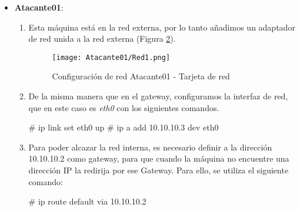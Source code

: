 \begin{itemize}
\begin{enumerate}
\item Por último, permitimos que el gateway reenvíe los paquetes que le llegan. Para eso se utiliza el siguiente comando: 
\begin{listing}[style=consola, numbers=none]
# echo 1 > /proc/sys/net/ipv4/ip_forward
\end{listing}

\item La configuración final de la máquina se puede observar en la Figura \ref{Gateway-Red2}.
\begin{figure}[H] %
\begin{center}
\texttt{[image: Gateway/Red2.png]}
\end{center}
\caption{Configuración de red Gateway}
\label{Gateway-Red2}
\end{figure}
\end{enumerate}

\item \textbf{Atacante01}:

\begin{enumerate}

\item Esta máquina está en la red externa, por lo tanto añadimos un adaptador de red unida a la red externa (Figura \ref{Atacante01-Red1}). 
\begin{figure}[H] %
\begin{center}
\texttt{[image: Atacante01/Red1.png]}
\end{center}
\caption{Configuración de red Atacante01 - Tarjeta de red}
\label{Atacante01-Red1}
\end{figure}

\item De la misma manera que en el gateway, configuramos la interfaz de red, que en este caso es {\it eth0} con los siguientes comandos. 
\begin{listing}[style=consola, numbers=none]
# ip link set eth0 up
# ip a add 10.10.10.3 dev eth0 
\end{listing}

\item Para poder alcazar la red interna, es necesario definir a la dirección 10.10.10.2 como gateway, para que cuando la máquina no encuentre una dirección IP la redirija por ese Gateway. Para ello, se utiliza el siguiente comando: 

\begin{listing}[style=consola, numbers=none]
# ip route default via 10.10.10.2
\end{listing}

\end{enumerate}
\end{itemize}

